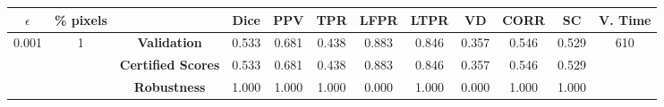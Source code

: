 \begin{longtable}{ c  c | c | c  c  c  c  c  c  c c c}
\toprule \textbf{$\epsilon$} & \textbf{\% pixels} & & \textbf{Dice} & \textbf{PPV} & \textbf{TPR} & \textbf{LFPR} & \textbf{LTPR} & \textbf{VD} & \textbf{CORR} & \textbf{SC} & \textbf{V. Time} \\
\midrule 
\multirow{3}{*}{0.001}  & \multirow{3}{*}{1} &\textbf{Validation} & 0.533 & 0.681 & 0.438 & 0.883 & 0.846 & 0.357 & 0.546 & 0.529 & \multirow{3}{*}{610} \\
 & & \textbf{Certified Scores} & 0.533 & 0.681 & 0.438 & 0.883 & 0.846 & 0.357 & 0.546 & 0.529 & \\
& & \textbf{Robustness} & 1.000 & 1.000 & 1.000 & 0.000 & 1.000 & 0.000 & 1.000 & 1.000 & \\
\end{longtable}
